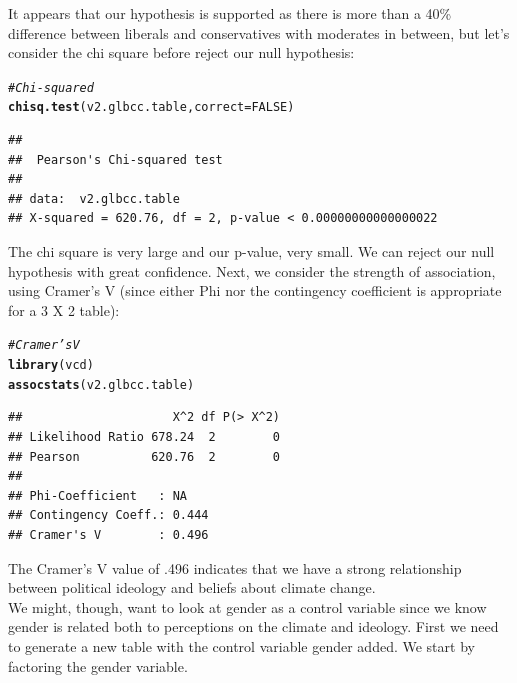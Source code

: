 \documentclass[11pt,openany]{book}\usepackage[]{graphicx}\usepackage[]{color}
\makeatletter
\newcommand{\hlnum}[1]{\textcolor[rgb]{0.686,0.059,0.569}{#1}}%
\newcommand{\hlcom}[1]{\textcolor[rgb]{0.678,0.584,0.686}{\textit{#1}}}%
\newcommand{\hlstd}[1]{\textcolor[rgb]{0.345,0.345,0.345}{#1}}%
\newcommand{\hlkwc}[1]{\textcolor[rgb]{0.333,0.667,0.333}{#1}}%
\newcommand{\hlkwd}[1]{\textcolor[rgb]{0.737,0.353,0.396}{\textbf{#1}}}%
\newenvironment{kframe}{%
 \def\at@end@of@kframe{}%
 \ifinner\ifhmode%
  \def\at@end@of@kframe{\end{minipage}}%
  \begin{minipage}{\columnwidth}%
 \fi\fi%
 \def\FrameCommand##1{\hskip\@totalleftmargin \hskip-\fboxsep
 \colorbox{shadecolor}{##1}\hskip-\fboxsep
     \hskip-\linewidth \hskip-\@totalleftmargin \hskip\columnwidth}%
 \MakeFramed {\advance\hsize-\width
   \@totalleftmargin\z@ \linewidth\hsize
   \@setminipage}}%
 {\par\unskip\endMakeFramed%
 \at@end@of@kframe}
\newenvironment{knitrout}{}{} %
\renewenvironment{knitrout}{\begin{singlespace}}{\end{singlespace}} %
\makeatother
\begin{document}
\noindent It appears that our hypothesis is supported as there is more than a 40\% difference between liberals and conservatives with moderates in between, but let's consider the chi square before reject our null hypothesis:
\begin{knitrout}
\color{fgcolor}\begin{kframe}
\begin{alltt}
\hlcom{# Chi-squared}
\hlkwd{chisq.test}\hlstd{(v2.glbcc.table,} \hlkwc{correct} \hlstd{=} \hlnum{FALSE}\hlstd{)}
\end{alltt}
\begin{verbatim}
## 
## 	Pearson's Chi-squared test
## 
## data:  v2.glbcc.table
## X-squared = 620.76, df = 2, p-value < 0.00000000000000022
\end{verbatim}
\end{kframe}
\end{knitrout}

\noindent The chi square is very large and our p-value, very small. We can reject our null hypothesis with great confidence.  Next, we consider the strength of association, using Cramer's V (since either Phi nor the contingency coefficient is appropriate for a 3 X 2 table):

\begin{knitrout}
\color{fgcolor}\begin{kframe}
\begin{alltt}
\hlcom{# Cramer's V}
\hlkwd{library}\hlstd{(vcd)}
\hlkwd{assocstats}\hlstd{(v2.glbcc.table)}
\end{alltt}
\begin{verbatim}
##                     X^2 df P(> X^2)
## Likelihood Ratio 678.24  2        0
## Pearson          620.76  2        0
## 
## Phi-Coefficient   : NA 
## Contingency Coeff.: 0.444 
## Cramer's V        : 0.496
\end{verbatim}
\end{kframe}
\end{knitrout}

\noindent The Cramer's V value of .496 indicates that we have a strong relationship between political ideology and beliefs about climate change.\\

We might, though, want to look at gender as a control variable since we know gender is related both to perceptions on the climate and ideology.  First we need to generate a new table with the control variable gender added.  We start by factoring the gender variable.
\end{document}
